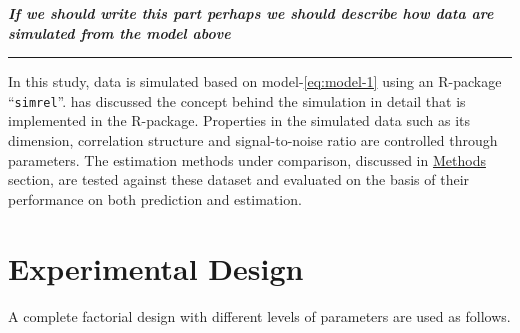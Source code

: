 \documentclass[12pt,3p,authoryear]{elsarticle}
\begin{document}
\emph{\textbf{If we should write this part perhaps we should describe
how data are simulated from the model above}}

\begin{center}\rule{0.5\linewidth}{\linethickness}\end{center}

In this study, data is simulated based on model-\eqref{eq:model-1} using
an R-package ``\texttt{simrel}''. \citet{Rimal_2018} has discussed the
concept behind the simulation in detail that is implemented in the
R-package. Properties in the simulated data such as its dimension,
correlation structure and signal-to-noise ratio are controlled through
parameters. The estimation methods under comparison, discussed in
\protect\hyperlink{methods}{Methods} section, are tested against these
dataset and evaluated on the basis of their performance on both
prediction and estimation.

\hypertarget{experimental-design}{\section{Experimental
Design}\label{experimental-design}}

A complete factorial design with different levels of parameters are used
as follows.
\end{document}
